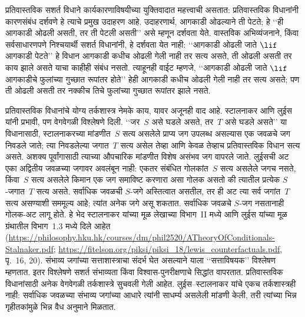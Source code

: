 \documentclass[../../../include/open-logic-section]{subfiles}
\begin{document}
प्रतिवास्तविक सशर्त विधाने
कार्यकारणाविषयीच्या
युक्तिवादात महत्त्वाची
असतात: प्रतिवास्तविक
विधानांनी कारणसंबंध
दर्शवणे हे त्याचे
प्रमुख उदाहरण आहे.
उदाहरणार्थ, आगकाडी
ओढल्याने ती पेटते;
हे ‘‘ही आगकाडी
ओढली असती, तर ती
पेटली असती’’ असे
म्हणून दर्शवता येते.
वास्तविक अभिव्यंजनाने,
किंवा सर्वसाधारणपणे
निश्चयार्थी सशर्त विधानांनी,
हे दर्शवता येत नाही:
‘‘आगकाडी ओढली जाते
$\lif$ आगकाडी पेटते’’
हे विधान आगकाडी
कधीच ओढली गेली
नाही तर सत्य असते,
ती ओढली असती
तर काय झाले असते
याचा काहीही संबंध
नसतो. त्याहूनही
वाईट म्हणजे,
‘‘आगकाडी ओढली जाते
$\lif$ आगकाडीचे
फुलांच्या गुच्छात
रूपांतर होते’’ हेही
आगकाडी कधीच
ओढली गेली नाही
तर सत्य असते;
पण ती ओढली
असती तर नक्कीच
तिचे फुलांच्या
गुच्छात रूपांतर
झाले नसते.

प्रतिवास्तविक विधानांचे योग्य तर्कशास्त्र नेमके काय,
यावर अजूनही वाद आहे. स्टालनाकर आणि लुईस यांनी
प्रभावी, पण वेगवेगळी विश्लेषणे दिली.
‘‘जर~$S$ असे घडले असते, तर~$T$ असे घडले असते’’
या विधानासाठी, स्टालनाकरच्या मांडणीत~$S$ सत्य
असलेले प्राप्य जग उपलब्ध असल्यास एक जवळचे जग
निवडले जाते; त्या निवडलेल्या जगात~$T$ सत्य असेल
तेव्हा आणि केवळ तेव्हाच प्रतिवास्तविक विधान सत्य असते.
अशक्य पूर्वांगासाठी त्याच्या औपचारिक मांडणीत
विशेष असंभव जग वापरले जाते.
लुईसची अट एका अद्वितीय जवळच्या जगावर अवलंबून नाही:
एकतर संबंधित गोलकांत~$S$ सत्य असलेले जगच नसते,
किंवा~$S$ सत्य असलेले किमान एक जग समाविष्ट करणारा
असा गोलक असतो की त्यातील प्रत्येक $S$-जगात~$T$
सत्य असते. सर्वाधिक जवळची $S$-जगे अस्तित्वात
असतील, तर ही अट त्या सर्व जगांत~$T$ सत्य असण्याशी
सममूल्य आहे; त्यांत अनेक जगे असू शकतात.
सर्वाधिक जवळचे $S$-जग नसतानाही गोलक-अट लागू होते.
हे भेद स्टालनाकर यांच्या मूळ लेखाच्या विभाग~II मध्ये
आणि लुईस यांच्या मूळ ग्रंथातील विभाग~1.3 मध्ये दिले आहेत
(\url{https://philosophy.hku.hk/courses/dm/phil2520/ATheoryOfConditionals-Stalnaker.pdf};
\url{https://fitelson.org/piksi/piksi_18/lewis_counterfactuals.pdf}, पृ.~16, 20).
संभाव्य जगांच्या
सत्ताशास्त्राचा
संदर्भ घेत असल्याने
याला ‘‘सत्ताविषयक’’
विश्लेषण म्हणतात.
इतर विश्लेषणे सशर्त
संभाव्यता किंवा
विश्वास-पुनरीक्षणाचे
सिद्धांत वापरतात.
प्रतिवास्तविक विधानांसाठी
अनेक वेगवेगळी
तर्कशास्त्रे सुचवली
गेली आहेत. लुईस--स्टालनाकर
यांचे एकच तर्कशास्त्रही
नाही: सर्वाधिक जवळच्या
संभाव्य जगांच्या आधारे
त्यांनी साधर्म्य असलेली
मांडणी केली, तरी
त्यांच्या भिन्न
गृहीतकांमुळे भिन्न
वैध अनुमाने मिळतात.
\end{document}
